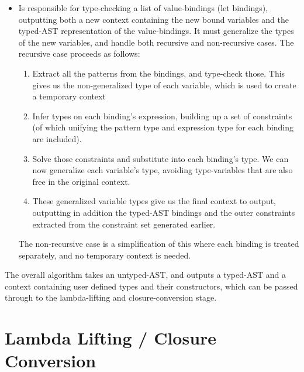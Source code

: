 \begin{itemize}
\item {} Is responsible for type-checking a list of value-bindings (let bindings), outputting both a new context containing the new bound variables and the typed-AST representation of the value-bindings. It must generalize the types of the new variables, and handle both recursive and non-recursive cases. The recursive case proceeds as follows:
\begin{enumerate}
\item Extract all the patterns from the bindings, and type-check those. This gives us the non-generalized type of each variable, which is used to create a temporary context
\item Infer types on each binding's expression, building up a set of constraints (of which unifying the pattern type and expression type for each binding are included).
\item Solve those constraints and substitute into each binding's type. We can now generalize each variable's type, avoiding type-variables that are also free in the original context.
\item These generalized variable types give us the final context to output, outputting in addition the typed-AST bindings and the outer constraints extracted from the constraint set generated earlier.
\end{enumerate}
The non-recursive case is a simplification of this where each binding is treated separately, and no temporary context is needed.
\end{itemize}

The overall algorithm takes an untyped-AST, and outputs a typed-AST and a context containing user defined types and their constructors, which can be passed through to the lambda-lifting and closure-conversion stage.

\section{Lambda Lifting / Closure Conversion}

